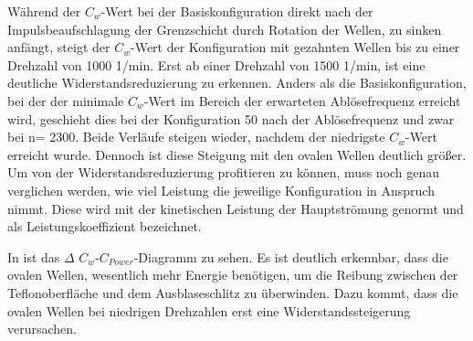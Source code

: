 W\"ahrend der $C_{w}$-Wert bei der Basiskonfiguration direkt nach der Impulsbeaufschlagung der Grenzschicht durch Rotation der Wellen, zu sinken anf\"angt, steigt der $C_{w}$-Wert der Konfiguration mit gezahnten Wellen bis zu einer Drehzahl von 1000 1/min. Erst ab einer Drehzahl von 1500 1/min, ist eine deutliche Widerstandsreduzierung zu erkennen. 
Anders als die Basiskonfiguration, bei der der minimale $C_{w}$-Wert im Bereich der erwarteten Abl\"osefrequenz erreicht wird, geschieht dies bei der Konfiguration 50 nach der Abl\"osefrequenz und zwar bei n= 2300. 
Beide Verl\"aufe steigen wieder, nachdem der niedrigste $C_{w}$-Wert erreicht wurde. Dennoch ist diese
Steigung mit den ovalen Wellen deutlich gr\"o\ss{}er.
Um von der Widerstandsreduzierung profitieren zu k\"onnen, muss noch genau verglichen werden, wie viel Leistung die jeweilige Konfiguration in Anspruch nimmt. Diese wird mit der kinetischen Leistung der Hauptstr\"omung genormt und als Leistungskoeffizient bezeichnet.

In  ist das $\Delta$ $C_{w}$-$C_{Power}$-Diagramm zu sehen. Es ist deutlich erkennbar, dass die ovalen Wellen, wesentlich mehr Energie ben\"otigen, um die Reibung zwischen der Teflonoberfl\"ache und dem Ausblaseschlitz zu \"uberwinden. Dazu kommt, dass die ovalen Wellen bei niedrigen Drehzahlen erst eine Widerstandssteigerung verursachen. 


